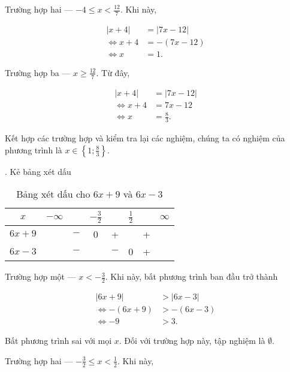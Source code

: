 \textcolor{colorEmphasis}{Trường hợp hai --- $-4\leq x < \frac{12}{7} $}. Khi này, 

\begin{align*}
   |x + 4| &= |7x - 12| \\
   \iff x + 4 &= -(7x - 12) \\
   \iff x &= 1.
\end{align*}

\textcolor{colorEmphasisGreen}{Trường hợp ba --- $x \geq \frac{12}{7}$}. Từ đây,

\begin{align*}
   |x + 4| &= |7x - 12| \\
   \iff x + 4 &= 7x - 12 \\
   \iff x &= \frac{8}{3}.
\end{align*}

Kết hợp các trường hợp và kiểm tra lại các nghiệm, chúng ta có nghiệm của phương trình là $x \in \left\{1; \frac{8}{3}\right\}$.

. Kẻ bảng xét dấu

\begin{table}[H]
   \centering
   \begin{tabular}{|c|ccccccc|}
   \hline
   $x$          & $-\infty$ &     & $-\frac{3}{2}$ &     & $\frac{1}{2}$ &   & $\infty$ \\
   \hline
   $6x + 9$        &           & $-$ &  0  &  +  &     & + &           \\
   \hline
   $6x - 3$        &           & $-$ &     & $-$ &  0  & + &           \\
   \hline
   \end{tabular}
   \caption{Bảng xét dấu cho $6x + 9$ và $6x - 3$}
   \label{tab:toan_hoc_nen_tang:ham_so_mot_bien:ham_tung_phan:gpt7}
\end{table}

\textcolor{colorEmphasisCyan}{Trường hợp một --- $x < -\frac{3}{2}$}. Khi này, bất phương trình ban đầu trở thành

\begin{align*}
   |6x + 9| &> |6x - 3| \\
   \iff -(6x + 9) &> -(6x - 3) \\
   \iff -9 &> 3.
\end{align*}

Bất phương trình sai với mọi $x$. Đối với trường hợp này, tập nghiệm là $\emptyset$.

\textcolor{colorEmphasis}{Trường hợp hai --- $-\frac{3}{2} \leq x < \frac{1}{2}$}. Khi này,

